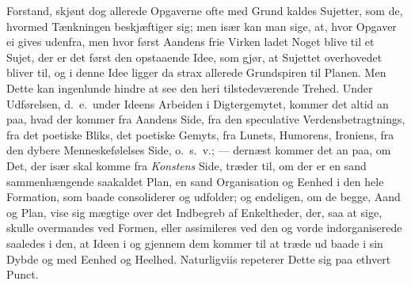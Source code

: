 \documentclass[12pt,a4paper]{book}
\newcommand{\apage}[1]{\marginnote{\footnotesize\textit{[#1]}}}
\begin{document}
Forstand, skjønt dog allerede Opgaverne ofte med Grund kaldes Sujetter,
som de, hvormed Tænkningen beskjæftiger sig; men især kan man sige, at,
hvor Opgaver ei gives udenfra, men hvor først Aandens frie Virken ladet
Noget blive til et Sujet, der er det først den opstaaende Idee, som gjør,
at Sujettet overhovedet bliver til, og i denne Idee ligger da strax
allerede Grundspiren til Planen. Men Dette kan ingenlunde hindre at see
den heri tilstedeværende Trehed. Under Udførelsen, d.\ e.\ under Ideens
Arbeiden i Digtergemytet, kommer det altid an paa, hvad der kommer fra
Aandens Side, fra den speculative Verdensbetragtnings, fra det poetiske
Bliks, det poetiske Gemyts, fra Lunets, Humorens, Ironiens, fra den dybere
Menneskefølelses Side, o.\ s.\ v.; --- dernæst kommer det an paa, om Det,
der især skal komme fra \emph{Konstens} Side, træder til, om der er en sand
sammenhængende saakaldet Plan, en sand Organisation og Eenhed i den hele
Formation, som baade consoliderer og udfolder; og endeligen, om de begge,
Aand og Plan, vise sig mægtige over det Indbegreb af Enkeltheder, der, saa
at sige, skulle overmandes ved Formen, eller assimileres ved den og vorde
indorganiserede saaledes i den, at Ideen i og gjennem dem kommer til at
træde ud baade i sin Dybde og \apage{5} med Eenhed og Heelhed. Naturligviis
repeterer Dette sig paa ethvert Punct.
\end{document}
